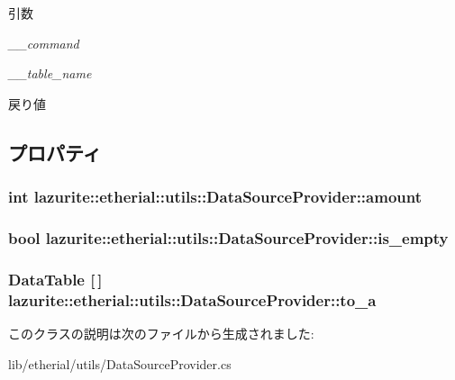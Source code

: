 \begin{DoxyParams}{引数}
\item[{\em \_\-\_\-command}]\item[{\em \_\-\_\-table\_\-name}]\end{DoxyParams}
\begin{DoxyReturn}{戻り値}

\end{DoxyReturn}


\subsection{プロパティ}
\hypertarget{classlazurite_1_1etherial_1_1utils_1_1_data_source_provider_aacb1dce2fde3fbe638ded3c835cbf06f}{
\subsubsection[{amount}]{\setlength{\rightskip}{0pt plus 5cm}int lazurite::etherial::utils::DataSourceProvider::amount}}
\label{classlazurite_1_1etherial_1_1utils_1_1_data_source_provider_aacb1dce2fde3fbe638ded3c835cbf06f}
\hypertarget{classlazurite_1_1etherial_1_1utils_1_1_data_source_provider_ad53038aae9b74df2f3a02586d6412b8d}{
\subsubsection[{is\_\-empty}]{\setlength{\rightskip}{0pt plus 5cm}bool lazurite::etherial::utils::DataSourceProvider::is\_\-empty}}
\label{classlazurite_1_1etherial_1_1utils_1_1_data_source_provider_ad53038aae9b74df2f3a02586d6412b8d}
\hypertarget{classlazurite_1_1etherial_1_1utils_1_1_data_source_provider_afd3b581f89c22a1d8f6bd9d470154a9c}{
\subsubsection[{to\_\-a}]{\setlength{\rightskip}{0pt plus 5cm}DataTable \mbox{[}$\,$\mbox{]} lazurite::etherial::utils::DataSourceProvider::to\_\-a}}
\label{classlazurite_1_1etherial_1_1utils_1_1_data_source_provider_afd3b581f89c22a1d8f6bd9d470154a9c}


このクラスの説明は次のファイルから生成されました:\begin{DoxyCompactItemize}
\item 
lib/etherial/utils/DataSourceProvider.cs\end{DoxyCompactItemize}
